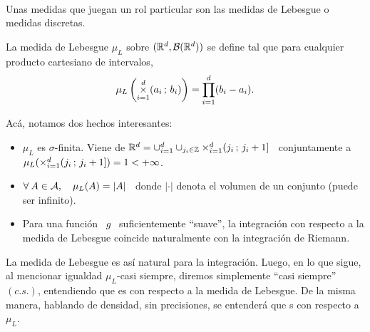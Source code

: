 \

Unas medidas que juegan un rol  particular son las medidas de Lebesgue o medidas
discretas.
%
\begin{definicion}\label{Def:MP:Lebesgue}
  La medida de Lebesgue $\mu_L$  sobre $(\mathbb{R}^d,\mathcal{B}(\mathbb{R}^d))$ se define tal que
  para cualquier producto cartesiano de intervalos,
  \[
  \mu_L\left(  \operatorname*{\times}_{i=1}^d  (a_i  \,  ;  \, b_i)  \right)  =  \prod_{i=1}^d
  (b_i-a_i).
  \]
\end{definicion}
%
Ac\'a, notamos dos hechos interesantes:
%
\begin{itemize}
%
\item $\mu_L$ es $\sigma$-finita. Viene de $\mathbb{R}^d = \cup_{i=1}^d \cup_{j_i \in
    \mathbb{Z}}  \operatorname*{\times}_{i=1}^d   (  j_i  \,   ;  \,  j_i+1]$  \   conjuntamente  a
  $\mu_L(\operatorname*{\times}_{i=1}^d ( j_i \, ; \, j_i+1]) = 1 < +\infty$.
%
\item $\forall \:  A \in \mathcal{A}, \quad  \mu_L(A) = |A|$ \ donde  $|\cdot|$ denota el
  volumen de un conjunto (puede ser infinito).
%
\item Para una funci\'on \ $g$ \ suficientemente ``suave'', la integraci\'on con
  respecto a la medida de Lebesgue coincide naturalmente con la integraci\'on de
  Riemann.
\end{itemize}
%
La medida de  Lebesgue es as\'i natural para la integraci\'on.  Luego, en lo que
sigue, al  mencionar igualdad  $\mu_L$-casi siempre, diremos  simplemente ``casi
siempre'' $(c.s.)$, entendiendo que es con  respecto a la medida de Lebesgue. De
la misma manera, hablando de densidad, sin precisiones, se entender\'a que s con
respecto a $\mu_L$.

